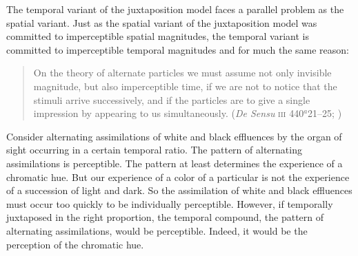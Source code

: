 The temporal variant of the juxtaposition model faces a parallel problem as the spatial variant. Just as the spatial variant of the juxtaposition model was committed to imperceptible spatial magnitudes, the temporal variant is committed to imperceptible temporal magnitudes and for much the same reason:
\begin{quote}
	On the theory of alternate particles we must assume not only invisible magnitude, but also imperceptible time, if we are not to notice that the stimuli arrive successively, and if the particles are to give a single impression by appearing to us simultaneously. (\emph{De Sensu} \textsc{iii} 440\( ^{a} \)21--25; \citealt[235]{Hett:1936fk})
\end{quote}
Consider alternating assimilations of white and black effluences by the organ of sight occurring in a certain temporal ratio. The pattern of alternating assimilations is perceptible. The pattern at least determines the experience of a chromatic hue. But our experience of a color of a particular is not the experience of a succession of light and dark. So the assimilation of white and black effluences must occur too quickly to be individually perceptible. However, if temporally juxtaposed in the right proportion, the temporal compound, the pattern of alternating assimilations, would be perceptible.  Indeed, it would be the perception of the chromatic hue.


